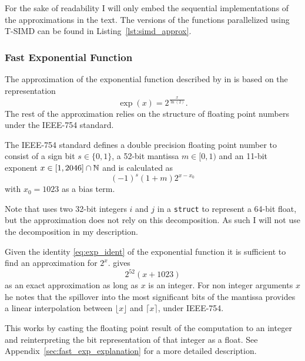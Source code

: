 \documentclass[a4paper, 11pt]{memoir}
\begin{document}
    For the sake of readability I will only embed the sequential implementations of the approximations in the text. The
    versions of the functions parallelized using T-SIMD can be found in Listing~\ref{lst:simd_approx}.

    \subsubsection{Fast Exponential Function}
    \label{sec:impl_fast_exp}
    The approximation of the exponential function described by \citeauthor{fast_exp} in 
    \cite{fast_exp} is based on the representation
    \begin{equation}
        \exp{(x)} = 2^{\frac{x}{\ln{(2)}}}.
        \label{eq:exp_ident}
    \end{equation}
    The rest of the approximation relies on the structure of floating point numbers under the IEEE-754 standard.

    The IEEE-754 standard defines a double precision floating point number to consist of a sign bit $s \in \{ 0, 1 \}$,
    a 52-bit mantissa $m \in [0, 1)$ and an 11-bit exponent $x \in [1, 2046] \cap \mathbb{N}$ and is calculated as
    \begin{equation}
        (-1)^s (1 + m) 2^{x - x_0}
        \label{eq:def_ieee754}
    \end{equation}
    with $x_0 = 1023$ as a bias term.

    Note that \citeauthor{fast_exp} uses two 32-bit integers $i$ and $j$ in a \texttt{struct} to represent a
    64-bit float, but the approximation does not rely on this decomposition. As such I will not use the decomposition
    in my description.

    Given the identity \eqref{eq:exp_ident} of the exponential function it is sufficient to find an approximation for
    $2^x$. \citeauthor{fast_exp} gives
    \begin{equation}
        2^{52}(x + 1023)
    \end{equation}
    as an exact approximation as long as $x$ is an integer. For non integer arguments $x$ he notes that the spillover into
    the most significant bits of the mantissa provides a linear interpolation between $\lfloor x \rfloor$ and $\lceil x
    \rceil$, under IEEE-754.

    This works by casting the floating point result of the computation to an integer and reinterpreting the bit
    representation of that integer as a float. See Appendix~\ref{sec:fast_exp_explanation} for a more detailed description.
\end{document}
